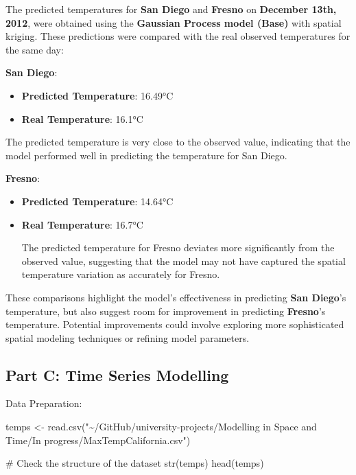 \documentclass[
  11pt,
]{article}
\newenvironment{Shaded}{\begin{snugshade}}{\end{snugshade}}
\newcommand{\CommentTok}[1]{\textcolor[rgb]{0.37,0.37,0.37}{#1}}
\newcommand{\FunctionTok}[1]{\textcolor[rgb]{0.28,0.35,0.67}{#1}}
\newcommand{\NormalTok}[1]{\textcolor[rgb]{0.00,0.23,0.31}{#1}}
\newcommand{\OtherTok}[1]{\textcolor[rgb]{0.00,0.23,0.31}{#1}}
\newcommand{\StringTok}[1]{\textcolor[rgb]{0.13,0.47,0.30}{#1}}
\begin{document}
The predicted temperatures for \textbf{San Diego} and \textbf{Fresno} on
\textbf{December 13th, 2012}, were obtained using the \textbf{Gaussian
Process model (Base)} with spatial kriging. These predictions were
compared with the real observed temperatures for the same day:

\textbf{San Diego}:

\begin{itemize}
\item
  \textbf{Predicted Temperature}: 16.49°C
\item
  \textbf{Real Temperature}: 16.1°C
\end{itemize}

The predicted temperature is very close to the observed value,
indicating that the model performed well in predicting the temperature
for San Diego.

\textbf{Fresno}:

\begin{itemize}
\item
  \textbf{Predicted Temperature}: 14.64°C
\item
  \textbf{Real Temperature}: 16.7°C

  The predicted temperature for Fresno deviates more significantly from
  the observed value, suggesting that the model may not have captured
  the spatial temperature variation as accurately for Fresno.
\end{itemize}

These comparisons highlight the model's effectiveness in predicting
\textbf{San Diego}'s temperature, but also suggest room for improvement
in predicting \textbf{Fresno}'s temperature. Potential improvements
could involve exploring more sophisticated spatial modeling techniques
or refining model parameters.

\subsection{Part C: Time Series
Modelling}\label{part-c-time-series-modelling}

Data Preparation:

\begin{Shaded}
\begin{Highlighting}[]
\NormalTok{temps }\OtherTok{\textless{}{-}} \FunctionTok{read.csv}\NormalTok{(}\StringTok{"\textasciitilde{}/GitHub/university{-}projects/Modelling in Space and Time/In progress/MaxTempCalifornia.csv"}\NormalTok{)}

\CommentTok{\# Check the structure of the dataset}
\FunctionTok{str}\NormalTok{(temps)}
\FunctionTok{head}\NormalTok{(temps)}
\end{Highlighting}
\end{Shaded}
\end{document}
